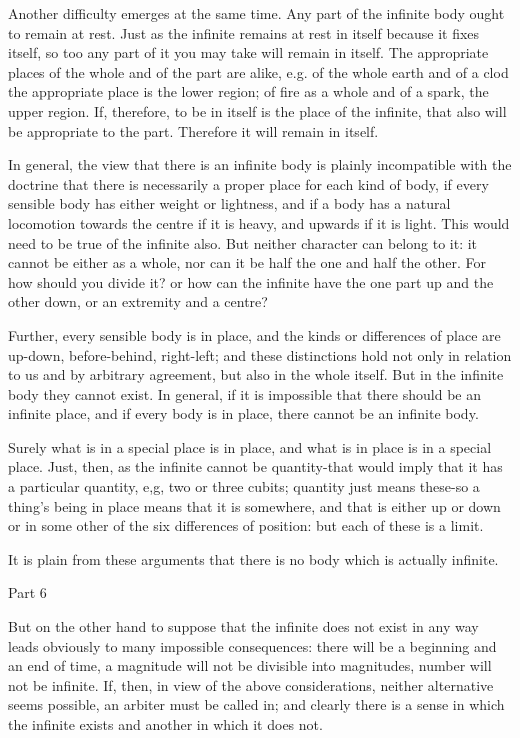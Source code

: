 Another difficulty emerges at the same time. Any part of the infinite
body ought to remain at rest. Just as the infinite remains at rest
in itself because it fixes itself, so too any part of it you may take
will remain in itself. The appropriate places of the whole and of
the part are alike, e.g. of the whole earth and of a clod the appropriate
place is the lower region; of fire as a whole and of a spark, the
upper region. If, therefore, to be in itself is the place of the infinite,
that also will be appropriate to the part. Therefore it will remain
in itself. 

In general, the view that there is an infinite body is plainly incompatible
with the doctrine that there is necessarily a proper place for each
kind of body, if every sensible body has either weight or lightness,
and if a body has a natural locomotion towards the centre if it is
heavy, and upwards if it is light. This would need to be true of the
infinite also. But neither character can belong to it: it cannot be
either as a whole, nor can it be half the one and half the other.
For how should you divide it? or how can the infinite have the one
part up and the other down, or an extremity and a centre?

Further, every sensible body is in place, and the kinds or differences
of place are up-down, before-behind, right-left; and these distinctions
hold not only in relation to us and by arbitrary agreement, but also
in the whole itself. But in the infinite body they cannot exist. In
general, if it is impossible that there should be an infinite place,
and if every body is in place, there cannot be an infinite body.

Surely what is in a special place is in place, and what is in place
is in a special place. Just, then, as the infinite cannot be quantity-that
would imply that it has a particular quantity, e,g, two or three cubits;
quantity just means these-so a thing's being in place means that it
is somewhere, and that is either up or down or in some other of the
six differences of position: but each of these is a limit.

It is plain from these arguments that there is no body which is actually
infinite. 

Part 6

But on the other hand to suppose that the infinite does not exist
in any way leads obviously to many impossible consequences: there
will be a beginning and an end of time, a magnitude will not be divisible
into magnitudes, number will not be infinite. If, then, in view of
the above considerations, neither alternative seems possible, an arbiter
must be called in; and clearly there is a sense in which the infinite
exists and another in which it does not. 

